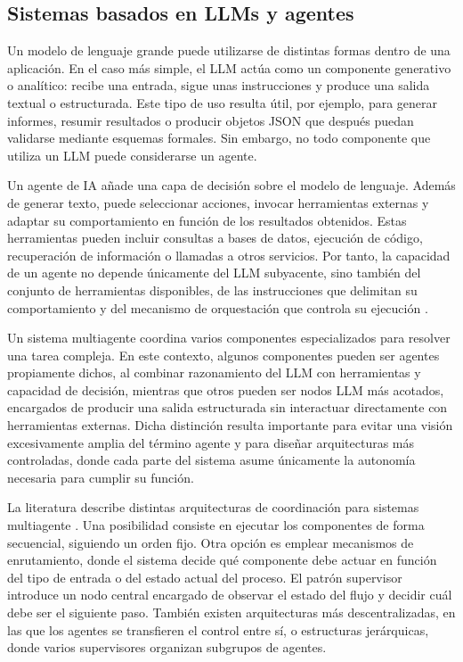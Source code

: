 \documentclass[12pt,a4paper]{article}
\theoremstyle{plain}
\begin{document}
\subsection{Sistemas basados en LLMs y agentes}
\label{sec:LLM_sys}
Un modelo de lenguaje grande puede utilizarse de distintas formas dentro de una aplicación. En el caso más simple, el LLM actúa como un componente generativo o analítico: recibe una entrada, sigue unas instrucciones y produce una salida textual o estructurada. Este tipo de uso resulta útil, por ejemplo, para generar informes, resumir resultados o producir objetos JSON que después puedan validarse mediante esquemas formales. Sin embargo, no todo componente que utiliza un LLM puede considerarse un agente.

Un agente de IA añade una capa de decisión sobre el modelo de lenguaje. Además de generar texto, puede seleccionar acciones, invocar herramientas externas y adaptar su comportamiento en función de los resultados obtenidos. Estas herramientas pueden incluir consultas a bases de datos, ejecución de código, recuperación de información o llamadas a otros servicios. Por tanto, la capacidad de un agente no depende únicamente del LLM subyacente, sino también del conjunto de herramientas disponibles, de las instrucciones que delimitan su comportamiento y del mecanismo de orquestación que controla su ejecución \cite{anthropic_agents}.

Un sistema multiagente coordina varios componentes especializados para resolver una tarea compleja. En este contexto, algunos componentes pueden ser agentes propiamente dichos, al combinar razonamiento del LLM con herramientas y capacidad de decisión, mientras que otros pueden ser nodos LLM más acotados, encargados de producir una salida estructurada sin interactuar directamente con herramientas externas. Dicha distinción resulta importante para evitar una visión excesivamente amplia del término agente y para diseñar arquitecturas más controladas, donde cada parte del sistema asume únicamente la autonomía necesaria para cumplir su función.

La literatura describe distintas arquitecturas de coordinación para sistemas multiagente \cite{langgraph_multiagent}. Una posibilidad consiste en ejecutar los componentes de forma secuencial, siguiendo un orden fijo. Otra opción es emplear mecanismos de enrutamiento, donde el sistema decide qué componente debe actuar en función del tipo de entrada o del estado actual del proceso. El patrón supervisor introduce un nodo central encargado de observar el estado del flujo y decidir cuál debe ser el siguiente paso. También existen arquitecturas más descentralizadas, en las que los agentes se transfieren el control entre sí, o estructuras jerárquicas, donde varios supervisores organizan subgrupos de agentes.
\end{document}
